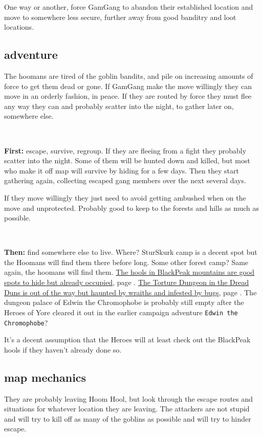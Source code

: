 One way or another, force GamGang to abandon their established location and move to somewhere less secure, further away from good banditry and loot locations.


\subsection*{adventure}

The hoomans are tired of the goblin bandits, and pile on increasing amounts of force to get them dead or gone. If GamGang make the move willingly they can move in an orderly fashion, in peace. If they are routed by force they must flee any way they can and probably scatter into the night, to gather later on, somewhere else.

\

\textbf{First:} escape, survive, regroup. If they are fleeing from a fight they probably scatter into the night. Some of them will be hunted down and killed, but most who make it off map will survive by hiding for a few days. Then they start gathering again, collecting escaped gang members over the next several days.

If they move willingly they just need to avoid getting ambushed when on the move and unprotected. Probably good to keep to the forests and hills as much as possible.

\

\textbf{Then:} find somewhere else to live. Where? SturSkurk camp is a decent spot but the Hoomans will find them there before long. Some other forest camp? Same again, the hoomans will find them. 
\hyperref[appendixmountaingoblins]{The hools in BlackPeak mountains are good spots to hide but already occupied}, page \pageref{appendixmountaingoblins}. 
\hyperref[appendixtorturedungeon]{The Torture Dungeon in the Dread Duns is out of the way but haunted by wraiths and infested by bugs}, page \pageref{appendixtorturedungeon}. 
The dungeon palace of Edwin the Chromophobe is probably still empty after the Heroes of Yore cleared it out in the earlier campaign adventure \texttt{Edwin the Chromophobe}?

It's a decent assumption that the Heroes will at least check out the BlackPeak hools if they haven't already done so. 


\subsection*{map mechanics}

They are probably leaving Hoom Hool, but look through the escape routes and situations for whatever location they are leaving. The attackers are not stupid and will try to kill off as many of the goblins as possible and will try to hinder escape.

